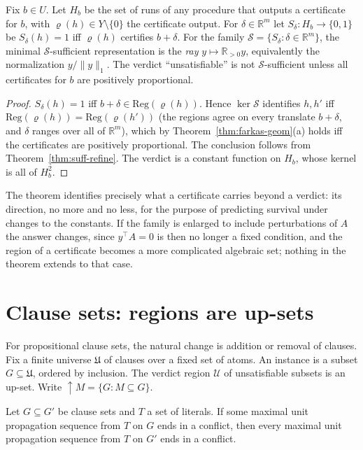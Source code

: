 \begin{theorem}
\label{thm:stab-min}
Fix $b\in U$. Let $H_b$ be the set of runs of any procedure that outputs a certificate for $b$, with $\varrho(h)\in Y\setminus\{0\}$ the certificate output. For $\delta\in\mathbb{R}^m$ let $S_\delta:H_b\to\{0,1\}$ be $S_\delta(h)=1$ iff $\varrho(h)$ certifies $b+\delta$. For the family $\mathcal S=\{S_\delta:\delta\in\mathbb{R}^m\}$, the minimal $\mathcal S$-sufficient representation is the \emph{ray} $y\mapsto\mathbb{R}_{>0}y$, equivalently the normalization $y/\|y\|_1$. The verdict ``unsatisfiable'' is not $\mathcal S$-sufficient unless all certificates for $b$ are positively proportional.
\end{theorem}

\begin{proof}
$S_\delta(h)=1$ iff $b+\delta\in\mathrm{Reg}(\varrho(h))$. Hence $\ker\mathcal S$ identifies $h,h'$ iff $\mathrm{Reg}(\varrho(h))=\mathrm{Reg}(\varrho(h'))$ (the regions agree on every translate $b+\delta$, and $\delta$ ranges over all of $\mathbb{R}^m$), which by Theorem~\ref{thm:farkas-geom}(a) holds iff the certificates are positively proportional. The conclusion follows from Theorem~\ref{thm:suff-refine}. The verdict is a constant function on $H_b$, whose kernel is all of $H_b^2$.
\end{proof}

The theorem identifies precisely what a certificate carries beyond a verdict: its direction, no more and no less, for the purpose of predicting survival under changes to the constants. If the family is enlarged to include perturbations of $A$ the answer changes, since $y^{\top}A=0$ is then no longer a fixed condition, and the region of a certificate becomes a more complicated algebraic set; nothing in the theorem extends to that case.

\section{Clause sets: regions are up-sets}

For propositional clause sets, the natural change is addition or removal of clauses. Fix a finite universe $\mathfrak U$ of clauses over a fixed set of atoms. An instance is a subset $G\subseteq\mathfrak U$, ordered by inclusion. The verdict region $\mathcal U$ of unsatisfiable subsets is an up-set. Write $\uparrow M=\{G:M\subseteq G\}$.

\begin{lemma}
\label{lem:up-mono}
Let $G\subseteq G'$ be clause sets and $T$ a set of literals. If some maximal unit propagation sequence from $T$ on $G$ ends in a conflict, then every maximal unit propagation sequence from $T$ on $G'$ ends in a conflict.
\end{lemma}

